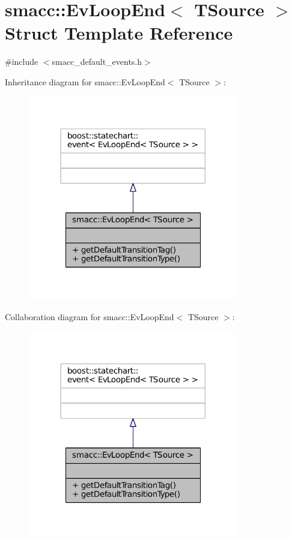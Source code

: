 \hypertarget{structsmacc_1_1EvLoopEnd}{}\section{smacc\+:\+:Ev\+Loop\+End$<$ T\+Source $>$ Struct Template Reference}
\label{structsmacc_1_1EvLoopEnd}


{\ttfamily \#include $<$smacc\+\_\+default\+\_\+events.\+h$>$}



Inheritance diagram for smacc\+:\+:Ev\+Loop\+End$<$ T\+Source $>$\+:
\nopagebreak
\begin{figure}[H]
\begin{center}
\leavevmode
\includegraphics[width=260pt]{structsmacc_1_1EvLoopEnd__inherit__graph}
\end{center}
\end{figure}


Collaboration diagram for smacc\+:\+:Ev\+Loop\+End$<$ T\+Source $>$\+:
\nopagebreak
\begin{figure}[H]
\begin{center}
\leavevmode
\includegraphics[width=260pt]{structsmacc_1_1EvLoopEnd__coll__graph}
\end{center}
\end{figure}

